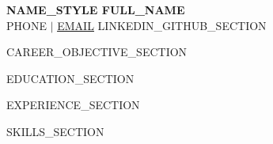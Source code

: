 \documentclass[letterpaper,11pt]{article}
\begin{document}
\begin{center}
    \textbf{{{NAME_STYLE}} {{FULL_NAME}}} \\ \vspace{1pt}
    \small {{PHONE}} $|$ \href{mailto:{{EMAIL}}}{\underline{{{EMAIL}}}} {{LINKEDIN_GITHUB_SECTION}}
\end{center}
\vspace{-6pt}

{{CAREER_OBJECTIVE_SECTION}}

\vspace{4pt}
{{EDUCATION_SECTION}}

\vspace{6pt}
{{EXPERIENCE_SECTION}}

\vspace{6pt}
{{SKILLS_SECTION}}

\end{document}
